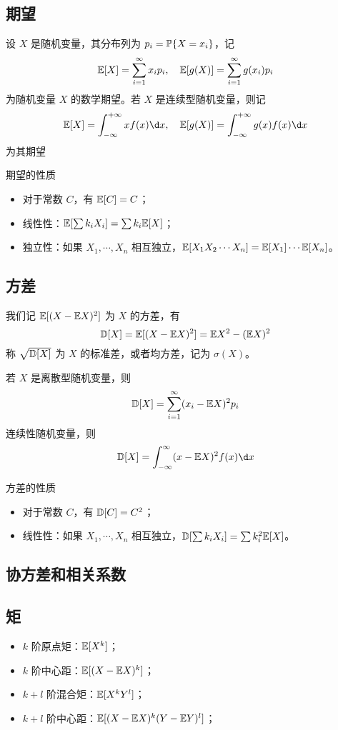 \subsection*{期望}

设 $X$ 是随机变量，其分布列为 $p_i = \mathbb{P}\{X = x_i\}$，记
\[ \mathbb{E} [X] = \sum_{i=1}^\infty x_i p_i, \quad \mathbb{E}[g(X)] = \sum_{i=1}^\infty g(x_i) p_i \]
为随机变量 $X$ 的数学期望。若 $X$ 是连续型随机变量，则记
\[ \bbE [X] = \int_{-\infty}^{+\infty} x f(x) \d x, \quad \bbE[g(X)] = \int_{-\infty}^{+\infty} g(x) f(x) \d x \]
为其期望

期望的性质
\begin{itemize}
	\item 对于常数 $C$，有 $\mathbb{E}[C] = C$；
	\item 线性性：$\mathbb{E}[\sum k_iX_i] = \sum k_i \mathbb{E} [X]$；
	\item 独立性：如果 $X_1, \cdots, X_n$ 相互独立，$\mathbb{E}[X_1X_2\cdots X_n] = \mathbb{E}[X_1] \cdots \mathbb{E}[X_n]$。
\end{itemize}

\subsection*{方差}

我们记 $\mathbb{E}[(X - \mathbb{E} X)^2]$ 为 $X$ 的方差，有
\[ \mathbb{D} [X] = \mathbb{E}[(X - \mathbb{E} X)^2] = \mathbb{E} X^2 - (\mathbb{E} X)^2 \]
称 $\sqrt{\mathbb{D} [X]}$ 为 $X$ 的标准差，或者均方差，记为 $\sigma(X)$。

若 $X$ 是离散型随机变量，则
\[ \mathbb{D} [X] = \sum_{i=1}^{\infty} (x_i - \mathbb{E} X)^2 p_i \]
连续性随机变量，则
\[ \bbD [X] = \int_{-\infty}^{\infty} (x-\bbE X)^2 f(x) \d x \]

方差的性质
\begin{itemize}
	\item 对于常数 $C$，有 $\mathbb{D}[C] = C^2$；
	\item 线性性：如果 $X_1, \cdots, X_n$ 相互独立，$\mathbb{D}[\sum k_iX_i] = \sum k_i^2 \mathbb{E} [X]$。
\end{itemize}

\subsection{协方差和相关系数}

\subsection*{矩}
\begin{itemize}
	\item $k$ 阶原点矩：$\mathbb{E}[X^k]$；
	\item $k$ 阶中心距：$\mathbb{E}[(X - \mathbb{E} X)^k]$；
	\item $k + l$ 阶混合矩：$\mathbb{E}[X^k Y^l]$；
	\item $k + l$ 阶中心距：$\mathbb{E}[(X - \mathbb{E} X)^k (Y - \mathbb{E} Y)^l]$；
\end{itemize}


